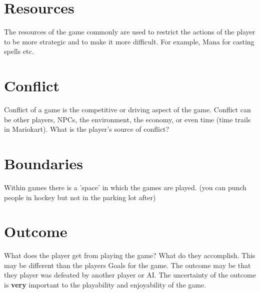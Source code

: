 \documentclass[12pt]{book}
\begin{document}
\section*{Resources}
The resources of the game commonly are used to restrict the actions of the player to be more strategic and to make it
        more difficult.
For example, Mana for casting spells etc.

\section*{Conflict}
Conflict of a game is the competitive or driving aspect of the game.
Conflict can be other players, NPCs, the environment, the economy, or even time (time trails in Mariokart).
What is the player's source of conflict?

\section*{Boundaries}
Within games there is a 'space' in which the games are played. (you can punch people in hockey but not in the parking lot after)

\section*{Outcome}
What does the player get from playing the game? What do they accomplish. This may be different than the players Goals for the game.
The outcome may be that they player was defeated by another player or AI.
The uncertainty of the outcome is \textbf{very} important to the playability and enjoyability of the game.
\end{document}
